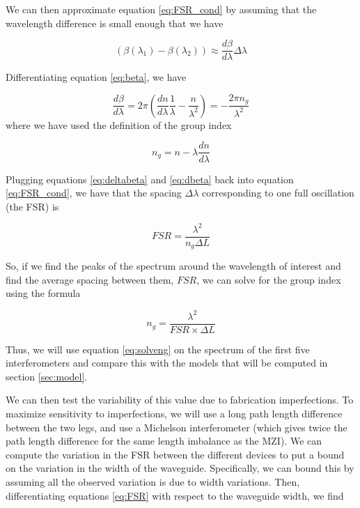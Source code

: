 \documentclass[journal]{IEEEtran}
\begin{document}
We can then approximate equation \ref{eq:FSR_cond} by assuming that the wavelength difference is small enough that we have

\begin{equation}
(\beta(\lambda_1) - \beta(\lambda_2)) \approx \frac{d\beta}{d\lambda} \Delta \lambda
\label{eq:deltabeta}
\end{equation}

Differentiating equation \ref{eq:beta}, we have

\begin{equation}
\frac{d\beta}{d\lambda} = 2\pi\left(\frac{dn}{d\lambda}\frac{1}{\lambda} - \frac{n}{\lambda^2} \right) = - \frac{2\pi  n_g}{\lambda^2}
\label{eq:dbeta}
\end{equation}
where we have used the definition of the group index 

\begin{equation}
n_g = n - \lambda \frac{dn}{d \lambda}
\label{eq:ngdef}
\end{equation}


Plugging equations \ref{eq:deltabeta} and  \ref{eq:dbeta} back into equation \ref{eq:FSR_cond}, we have that the spacing $\Delta \lambda$ corresponding to one full oscillation (the FSR) is 

\begin{equation}
FSR = \frac{\lambda^2}{n_g \Delta L}
\label{eq:FSR}
\end{equation}

So, if we find the peaks of the spectrum around the wavelength of interest and find the average spacing between them, $FSR$, we can solve for the group index using the formula

\begin{equation}
n_g = \frac{\lambda^2}{FSR \times \Delta L}
\label{eq:solveng}
\end{equation}

Thus, we will use equation \ref{eq:solveng} on the spectrum of the first five interferometers and compare this with the models that will be computed in section \ref{sec:model}.

We can then test the variability of this value due to fabrication imperfections. To maximize sensitivity to imperfections, we will use a long path length difference between the two legs, and use a Michelson interferometer (which gives twice the path length difference for the same length imbalance as the MZI). We can compute the variation in the FSR between the different devices to put a bound on the variation in the width of the waveguide. Specifically, we can bound this by assuming all the observed variation is due to width variations. Then, differentiating equations \ref{eq:FSR} with respect to the waveguide width, we find
\end{document}
